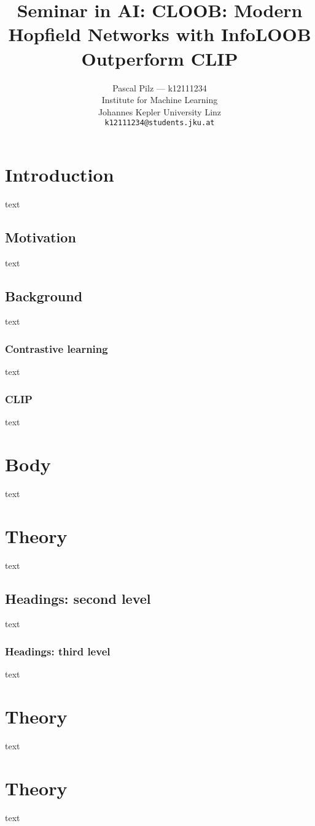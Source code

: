\documentclass{article}
\title{Seminar in AI: CLOOB: Modern Hopfield Networks with InfoLOOB Outperform CLIP}
\author{%
  Pascal Pilz --- k12111234 \\
  Institute for Machine Learning\\
  Johannes Kepler University Linz\\
  \texttt{k12111234@students.jku.at}}
\begin{document}
\maketitle


\section{Introduction}


text \citet{cloob}


\subsection{Motivation}


text \citet{clip}


\subsection{Background}


text


\subsubsection{Contrastive learning}


text


\subsubsection{CLIP}


text


\section{Body}


text


\section{Theory}


text


\subsection{Headings: second level}


text


\subsubsection{Headings: third level}


text


\section{Theory}


text


\section{Theory}


text

\clearpage


\end{document}

